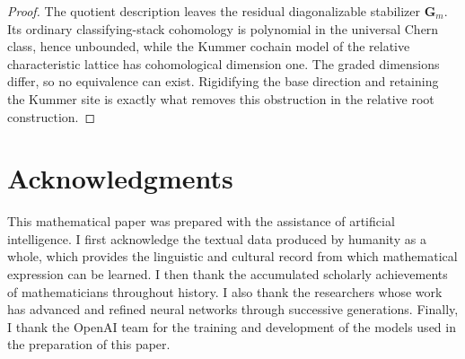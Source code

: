 \documentclass[11pt]{article}
\theoremstyle{definition}
\theoremstyle{remark}
\begin{document}
\begin{proof}
The quotient description leaves the residual diagonalizable stabilizer
$\mathbf G_m$.  Its ordinary classifying-stack cohomology is polynomial in
the universal Chern class, hence unbounded, while the Kummer cochain model
of the relative characteristic lattice has cohomological dimension one.
The graded dimensions differ, so no equivalence can exist.  Rigidifying the
base direction and retaining the Kummer site is exactly what removes this
obstruction in the relative root construction.
\end{proof}

\section*{Acknowledgments}

This mathematical paper was prepared with the assistance of artificial intelligence.  I
first acknowledge the textual data produced by humanity as a whole, which
provides the linguistic and cultural record from which mathematical expression
can be learned.  I then thank the accumulated scholarly achievements of
mathematicians throughout history.  I also thank the researchers whose work has
advanced and refined neural networks through successive generations.  Finally,
I thank the OpenAI team for the training and development of the models used in
the preparation of this paper.
\end{document}
